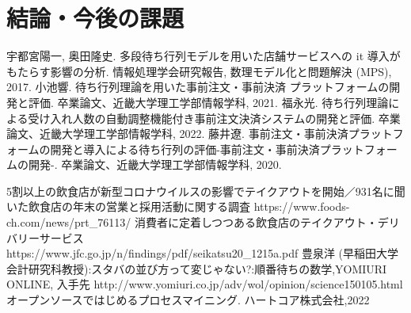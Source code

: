 \documentclass{jsarticle}
\begin{document}
\newpage

\section{結論・今後の課題}






\newpage

\begin{thebibliography}{99}
 宇都宮陽一, 奥田隆史. 多段待ち行列モデルを用いた店舗サービスへの it 導入がもたらす影響の分析. 情報処理学会研究報告, 数理モデル化と問題解決 (MPS), 2017.
 小池響. 待ち行列理論を用いた事前注文・事前決済 プラットフォームの開発と評価. 卒業論文、近畿大学理工学部情報学科, 2021.
 福永光. 待ち行列理論による受け入れ人数の自動調整機能付き事前注文決済システムの開発と評価. 卒業論文、近畿大学理工学部情報学科, 2022.
藤井遼. 事前注文・事前決済プラットフォームの開発と導入による待ち行列の評価-事前注文・事前決済プラットフォームの開発-. 卒業論文、近畿大学理工学部情報学科, 2020.

5割以上の飲食店が新型コロナウイルスの影響でテイクアウトを開始／931名に聞いた飲食店の年末の営業と採用活動に関する調査 https://www.foods-ch.com/news/prt\_76113/  
消費者に定着しつつある飲食店のテイクアウト・デリバリーサービス\\
https://www.jfc.go.jp/n/findings/pdf/seikatsu20\_1215a.pdf
豊泉洋 (早稲田大学会計研究科教授):スタバの並び方って変じゃない?:順番待ちの数学,YOMIURI ONLINE, 入手先 http://www.yomiuri.co.jp/adv/wol/opinion/science150105.html
オープンソースではじめるプロセスマイニング. ハートコア株式会社,2022
\end{thebibliography}
\end{document}
